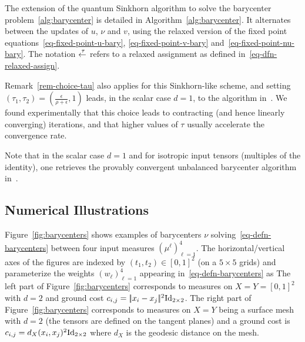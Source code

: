 The extension of the quantum Sinkhorn algorithm to solve the barycenter problem~\eqref{alg:barycenter} is detailed in Algorithm~\ref{alg:barycenter}. It alternates between the updates of $u$, $\nu$ and $v$, using the relaxed version of the fixed point equations~\eqref{eq-fixed-point-u-bary}, \eqref{eq-fixed-point-v-bary} and~\eqref{eq-fixed-point-nu-bary}. The notation $\overset{\;\tau}{\leftarrow}$ refers to a relaxed assignment as defined in~\eqref{eq-dfn-relaxed-assign}. 

\begin{rem}
Remark~\ref{rem-choice-tau} also applies for this Sinkhorn-like scheme, and setting $(\tau_1,\tau_2)=(\tfrac{\epsilon}{\rho+\epsilon},1)$ leads, in the scalar case $d=1$, to the algorithm in~\cite{2016-chizat-sinkhorn}. We found experimentally that this choice leads to contracting (and hence linearly converging) iterations, and that higher values of $\tau$ usually accelerate the convergence rate. 
\end{rem}

\begin{rem}
Note that in the scalar case $d=1$ and for isotropic input tensors (multiples of the identity), one retrieves the provably convergent unbalanced barycenter algorithm in~\cite{2016-chizat-sinkhorn}.
\end{rem}




\subsection{Numerical Illustrations}

Figure~\ref{fig:barycenters} shows examples of barycenters $\nu$ solving~\eqref{eq-defn-barycenters} between four input measures $(\mu^\ell)_{\ell=1}^4$. The horizontal/vertical axes of the figures are indexed by $(t_1,t_2) \in [0,1]^2$ (on a $5 \times 5$ grids) and parameterize the weights $(w_\ell)_{\ell=1}^4$ appearing in~\eqref{eq-defn-barycenters} as
The left part of Figure~\ref{fig:barycenters} corresponds to measures on $X=Y=[0,1]^2$ with $d=2$ and ground cost $c_{i,j}=|\!| x_i-x_j |\!|^2\mathrm{Id}_{2 \times 2}$.
%
The right part of Figure~\ref{fig:barycenters} corresponds to measures on $X=Y$ being a surface mesh with $d=2$ (the tensors are defined on the tangent planes) and a ground cost is $c_{i,j}=d_X(x_i,x_j)^2\mathrm{Id}_{2 \times 2}$ where $d_X$ is the geodesic distance on the mesh.




